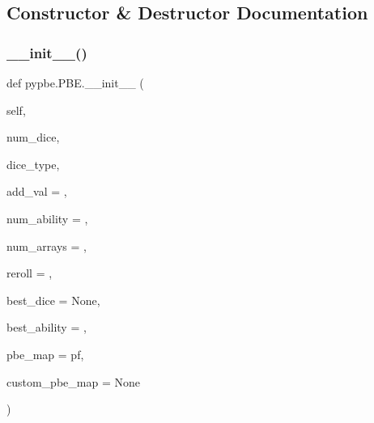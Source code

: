 \subsection{Constructor \& Destructor Documentation}
\mbox{\label{classpypbe_1_1_p_b_e_ad36bf08bcbbbc904fb3ea360c18f694c}} 
\subsubsection{\texorpdfstring{\+\_\+\+\_\+init\+\_\+\+\_\+()}{\_\_init\_\_()}}
{\footnotesize\ttfamily def pypbe.\+P\+B\+E.\+\_\+\+\_\+init\+\_\+\+\_\+ (\begin{DoxyParamCaption}\item[{}]{self,  }\item[{}]{num\+\_\+dice,  }\item[{}]{dice\+\_\+type,  }\item[{}]{add\+\_\+val = {},  }\item[{}]{num\+\_\+ability = {},  }\item[{}]{num\+\_\+arrays = {},  }\item[{}]{reroll = {},  }\item[{}]{best\+\_\+dice = {\ttfamily None},  }\item[{}]{best\+\_\+ability = {},  }\item[{}]{pbe\+\_\+map = {\ttfamily \textquotesingle{}pf\textquotesingle{}},  }\item[{}]{custom\+\_\+pbe\+\_\+map = {\ttfamily None} }\end{DoxyParamCaption})}

